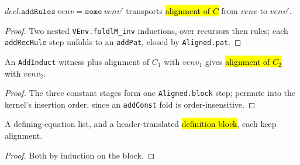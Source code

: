 \begin{lemma}
\label{thm:aligned-add-rules}
\leanok
{}

 $decl.\mathtt{addRules}\ venv = \mathtt{some}\ venv'$ transports
\hl{alignment of $C$} from $venv$ to $venv'$.
\end{lemma}
\begin{proof}
\leanok
{} Two nested \texttt{VEnv.foldlM\_inv} inductions, over recursors then rules; each
\texttt{addRecRule} step unfolds to an \texttt{addPat}, closed by \texttt{Aligned.pat}.
\end{proof}

\begin{theorem}
\label{thm:aligned-add-induct}
\leanok
{}

 An \texttt{AddInduct} witness plus alignment of $C_1$ with $venv_1$ gives
\hl{alignment of $C_2$} with $venv_2$.
\end{theorem}
\begin{proof}
\leanok
{} The three constant stages form one \texttt{Aligned.block} step; permute into
the kernel's insertion order, since an \texttt{addConst} fold is order-insensitive.
\end{proof}

\begin{lemma}
\label{family:aligned-defs}
\leanok
{}

 A defining-equation list, and a header-translated \hl{definition block},
each keep alignment.
\end{lemma}
\begin{proof}
\leanok
{} Both by induction on the block.
\end{proof}

